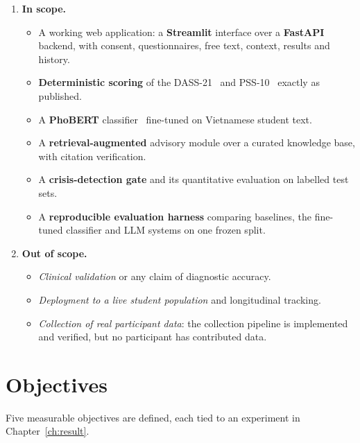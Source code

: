 \begin{enumerate}
	\item \textbf{In scope.}
	      \begin{itemize}
	      	\item A working web application: a \textbf{Streamlit} interface over a \textbf{FastAPI} backend, with consent, questionnaires, free text, context, results and history.
	      	\item \textbf{Deterministic scoring} of the DASS-21~\cite{lovibond1995} and PSS-10~\cite{cohen1983} exactly as published.
	      	\item A \textbf{PhoBERT} classifier~\cite{nguyen2020phobert} fine-tuned on Vietnamese student text.
	      	\item A \textbf{retrieval-augmented} advisory module over a curated knowledge base, with citation verification.
	      	\item A \textbf{crisis-detection gate} and its quantitative evaluation on labelled test sets.
	      	\item A \textbf{reproducible evaluation harness} comparing baselines, the fine-tuned classifier and LLM systems on one frozen split.
	      \end{itemize}
	\item \textbf{Out of scope.}
	      \begin{itemize}
	      	\item \textit{Clinical validation} or any claim of diagnostic accuracy.
	      	\item \textit{Deployment to a live student population} and longitudinal tracking.
	      	\item \textit{Collection of real participant data}: the collection pipeline is implemented and verified, but no participant has contributed data.
	      \end{itemize}
\end{enumerate}

\section{Objectives}
Five measurable objectives are defined, each tied to an experiment in Chapter~\ref{ch:result}.

